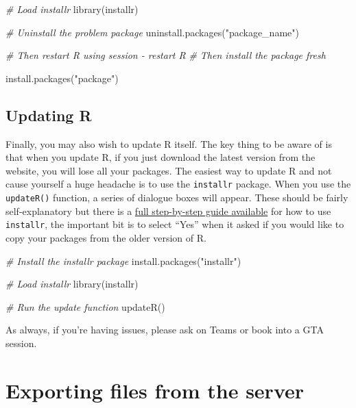 \documentclass[
  oneside]{book}
\newenvironment{Shaded}{\begin{snugshade}}{\end{snugshade}}
\newcommand{\CommentTok}[1]{\textcolor[rgb]{0.56,0.35,0.01}{\textit{#1}}}
\newcommand{\FunctionTok}[1]{\textcolor[rgb]{0.00,0.00,0.00}{#1}}
\newcommand{\NormalTok}[1]{#1}
\newcommand{\StringTok}[1]{\textcolor[rgb]{0.31,0.60,0.02}{#1}}
\begin{document}
\begin{Shaded}
\begin{Highlighting}[]
\CommentTok{\# Load installr}
\FunctionTok{library}\NormalTok{(installr)}

\CommentTok{\# Uninstall the problem package}
\FunctionTok{uninstall.packages}\NormalTok{(}\StringTok{"package\_name"}\NormalTok{)}

\CommentTok{\# Then restart R using session {-} restart R}
\CommentTok{\# Then install the package fresh}

\FunctionTok{install.packages}\NormalTok{(}\StringTok{"package"}\NormalTok{)}
\end{Highlighting}
\end{Shaded}

\hypertarget{updating-r}{%
\section{Updating R}\label{updating-r}}

Finally, you may also wish to update R itself. The key thing to be aware of is that when you update R, if you just download the latest version from the website, you will lose all your packages. The easiest way to update R and not cause yourself a huge headache is to use the \texttt{installr} package. When you use the \texttt{updateR()} function, a series of dialogue boxes will appear. These should be fairly self-explanatory but there is a \href{https://www.r-statistics.com/2015/06/a-step-by-step-screenshots-tutorial-for-upgrading-r-on-windows/}{full step-by-step guide available} for how to use \texttt{installr}, the important bit is to select ``Yes'' when it asked if you would like to copy your packages from the older version of R.

\begin{Shaded}
\begin{Highlighting}[]
\CommentTok{\# Install the installr package}
\FunctionTok{install.packages}\NormalTok{(}\StringTok{"installr"}\NormalTok{)}

\CommentTok{\# Load installr}
\FunctionTok{library}\NormalTok{(installr)}

\CommentTok{\# Run the update function}
\FunctionTok{updateR}\NormalTok{()}
\end{Highlighting}
\end{Shaded}

As always, if you're having issues, please ask on Teams or book into a GTA session.

\hypertarget{exporting-files-from-the-server}{%
\chapter{Exporting files from the server}\label{exporting-files-from-the-server}}
\end{document}
